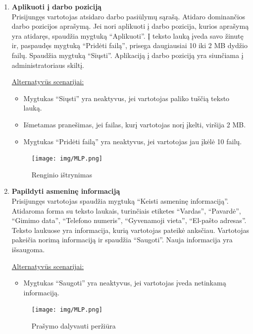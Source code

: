 \documentclass{VUMIFPSkursinis}
\begin{document}
\begin{enumerate} [label = \textbf{U\arabic*.}]
			\item \textbf{Aplikuoti į darbo poziciją} \\
				Prisijungęs vartotojas atsidaro darbo pasiūlymų sąrašą. Atidaro dominančios darbo pozicijos aprašymą. Jei nori aplikuoti į darbo pozicija, kurios aprašymą yra atidaręs, spaudžia mygtuką “Aplikuoti”. Į teksto lauką įveda savo žinutę ir, paspaudęs mygtuką “Pridėti failą”, prisega daugiausiai 10 iki 2 MB dydžio failų. Spaudžia mygtuką “Siųsti”. Aplikaciją į darbo poziciją yra siunčiama į administratoriaus skiltį.
				
				\underline{Alternatyvūs scenarijai:}
				\begin{itemize}
					\item Mygtukas “Siųsti” yra neaktyvus, jei vartotojas paliko tuščią teksto lauką.
					\item Išmetamas pranešimas, jei failas, kurį vartotojas norį įkelti, viršija 2 MB.
					\item Mygtukas “Pridėti failą” yra neaktyvus, jei vartotojas jau įkėlė 10 failų.
				\end{itemize}
				
				\begin{figure}[H]
					\centering
					\texttt{[image: img/MLP.png]}
					\caption{Renginio ištrynimas}
					\label{fig:istrinti-rengini}
				\end{figure}
				
			\item \textbf{Papildyti asmeninę informaciją} \\
				Prisijungęs vartotojas spaudžia mygtuką “Keisti asmeninę informaciją”. Atidaroma forma su teksto laukais, turinčiais etiketes “Vardas”, “Pavardė”, “Gimimo data”, “Telefono numeris”, “Gyvenamoji vieta”, “El-pašto adresas”. Teksto laukuose yra informacija, kurią vartotojas pateikė anksčiau. Vartotojas pakeičia norimą informaciją ir spaudžia “Saugoti”. Nauja informacija yra išsaugoma.
				
				\underline{Alternatyvūs scenarijai:}
				\begin{itemize}
					\item Mygtukas “Saugoti” yra neaktyvus, jei vartotojas įveda netinkamą informaciją.
				\end{itemize}
				
				\begin{figure}[H]
					\centering
					\texttt{[image: img/MLP.png]}
					\caption{Prašymo dalyvauti peržiūra}
					\label{fig:priimti-dalyvi}
				\end{figure}


\end{enumerate}
\end{document}
